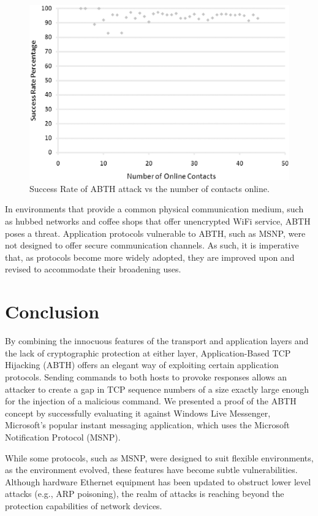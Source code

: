 \documentclass{sig-alternate}
\begin{document}
\begin{figure}[h]
	\centering
	\caption{Success Rate of ABTH attack vs the number of contacts online.}
	\label{fig:successrate}
	\includegraphics[width=\columnwidth]{graphics/plot.eps}
\end{figure}

In environments that provide a common physical communication medium, such as hubbed networks and coffee shops that offer unencrypted WiFi service, ABTH poses a threat.
Application protocols vulnerable to ABTH, such as MSNP, were not designed to offer secure communication channels.
As such, it is imperative that, as protocols become more widely adopted, they are improved upon and revised to accommodate their broadening uses.

\section{Conclusion}
\label{sec:conclusion}

By combining the innocuous features of the transport and application layers and the lack of cryptographic protection at either layer, Application-Based TCP Hijacking (ABTH) offers an elegant way of exploiting certain application protocols.
Sending commands to both hosts to provoke responses allows an attacker to create a gap in TCP sequence numbers of a size exactly large enough for the injection of a malicious command.
We presented a proof of the ABTH concept by successfully evaluating it against Windows Live Messenger, Microsoft's popular instant messaging application, which uses the Microsoft Notification Protocol (MSNP).

While some protocols, such as MSNP, were designed to suit flexible environments, as the environment evolved, these features have become subtle vulnerabilities.
Although hardware Ethernet equipment has been updated to obstruct lower level attacks (e.g., ARP poisoning), the realm of attacks is reaching beyond the protection capabilities of network devices.



\end{document}
